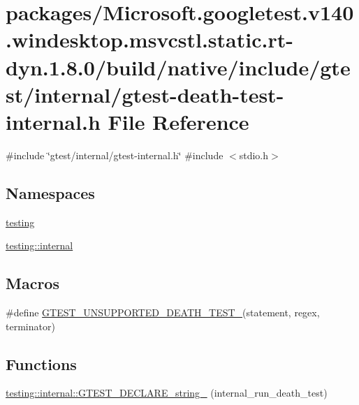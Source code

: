 \hypertarget{gtest-death-test-internal_8h}{}\section{packages/\+Microsoft.googletest.\+v140.\+windesktop.\+msvcstl.\+static.\+rt-\/dyn.1.8.0/build/native/include/gtest/internal/gtest-\/death-\/test-\/internal.h File Reference}
\label{gtest-death-test-internal_8h}
{\ttfamily \#include \char`\"{}gtest/internal/gtest-\/internal.\+h\char`\"{}}\newline
{\ttfamily \#include $<$stdio.\+h$>$}\newline
\subsection*{Namespaces}
\begin{DoxyCompactItemize}
\item 
 \mbox{\hyperlink{namespacetesting}{testing}}
\item 
 \mbox{\hyperlink{namespacetesting_1_1internal}{testing\+::internal}}
\end{DoxyCompactItemize}
\subsection*{Macros}
\begin{DoxyCompactItemize}
\item 
\#define \mbox{\hyperlink{gtest-death-test-internal_8h_a29a145cda8bd2d0c6a78b0ac1d670d18}{G\+T\+E\+S\+T\+\_\+\+U\+N\+S\+U\+P\+P\+O\+R\+T\+E\+D\+\_\+\+D\+E\+A\+T\+H\+\_\+\+T\+E\+S\+T\+\_\+}}(statement,  regex,  terminator)
\end{DoxyCompactItemize}
\subsection*{Functions}
\begin{DoxyCompactItemize}
\item 
\mbox{\hyperlink{namespacetesting_1_1internal_ac20f635c3285878fc1195ce687f23950}{testing\+::internal\+::\+G\+T\+E\+S\+T\+\_\+\+D\+E\+C\+L\+A\+R\+E\+\_\+string\+\_\+}} (internal\+\_\+run\+\_\+death\+\_\+test)
\end{DoxyCompactItemize}

